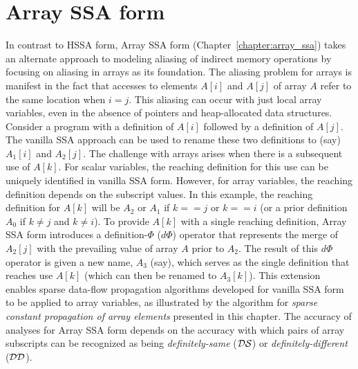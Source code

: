 \section{Array SSA form}

In contrast to HSSA form, Array SSA form (Chapter~\ref{chapter:array_ssa}) takes an alternate approach to modeling aliasing of indirect memory operations by focusing on aliasing in arrays as its foundation. 
The aliasing problem for arrays is manifest in the fact that accesses to elements $A[i]$ and $A[j]$ of array $A$ refer to the same location when $i = j$. 
This aliasing can occur with just local array variables, even in the absence of pointers and heap-allocated data structures. 
Consider a program with a definition of $A[i]$ followed by a definition of $A[j]$. 
The vanilla SSA approach can be used to rename these two definitions to (say) $A_1[i]$ and $A_2[j]$. 
The challenge with arrays arises when there is a subsequent use of $A[k]$. 
For scalar variables, the reaching definition for this use can be uniquely identified in vanilla SSA form. 
However, for array variables, the reaching definition depends on the subscript values. 
In this example, the reaching definition for $A[k]$ will be $A_2$ or $A_1$ if $k == j$ or $k == i$ (or a prior definition $A_0$ if $k \not= j$ and $k \not= i$). 
To provide $A[k]$ with a single reaching definition, Array SSA form introduces a definition-$\Phi$ ($d\Phi$) operator that represents the merge of $A_2[j]$ with the prevailing value of array $A$ prior to $A_2$. 
The result of this $d\Phi$ operator is given a new name, $A_3$ (say), which serves as the single definition that reaches use $A[k]$ (which can then be renamed to $A_3[k]$). 
This extension enables sparse data-flow propagation algorithms developed for vanilla SSA form to be applied to array variables, as illustrated by the algorithm for {\em sparse constant propagation of array elements} presented in this chapter. 
The accuracy of analyses for Array SSA form depends on the accuracy with which pairs of array subscripts can be recognized as being {\em definitely-same} (${\cal DS}$) or {\em definitely-different} (${\cal DD}$).

